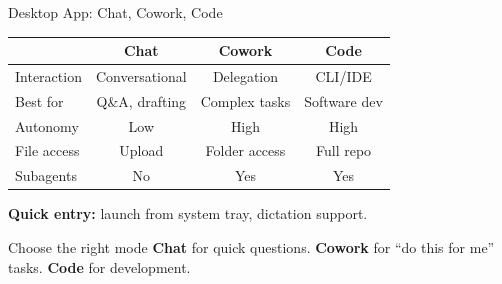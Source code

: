 \documentclass[aspectratio=169]{beamer}
\begin{document}
\begin{frame}{Desktop App: Chat, Cowork, Code}
\begin{table}
\centering\small
\begin{tabular}{lccc}
\toprule
 & \textbf{Chat} & \textbf{Cowork} & \textbf{Code} \\
\midrule
Interaction & Conversational & Delegation & CLI/IDE \\
Best for & Q\&A, drafting & Complex tasks & Software dev \\
Autonomy & Low & High & High \\
File access & Upload & Folder access & Full repo \\
Subagents & No & Yes & Yes \\
\bottomrule
\end{tabular}
\end{table}

\bigskip
\textbf{Quick entry:} launch from system tray, dictation support.

\begin{block}{Choose the right mode}
\textbf{Chat} for quick questions. \textbf{Cowork} for ``do this for me'' tasks. \textbf{Code} for development.
\end{block}
\end{frame}
\end{document}
